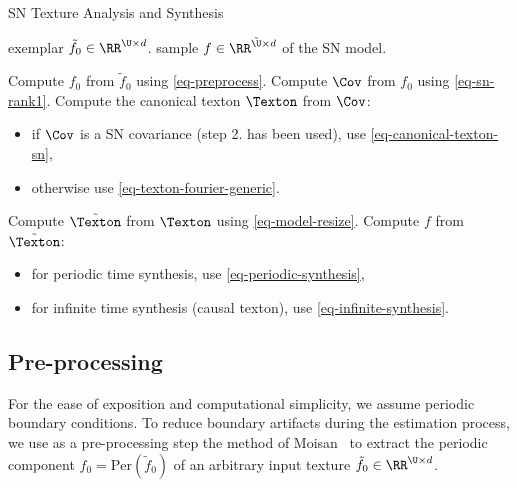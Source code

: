 \begin{algorithm}[ht!]
\caption{SN Texture Analysis and Synthesis}
\label{alg-gaussian-texture-modeling}
\begin{algorithmic}[1]
\Require exemplar $\tilde f_0 \in \RR^{\U \times d}$.
\Ensure sample $f \in \RR^{\tilde \U \times d}$ of the SN model.
\Statex
\begin{enumerate}
	 Compute $f_0$ from $\tilde f_0$ using \eqref{eq-preprocess}.
	 Compute $\Cov$ from $f_0$ using \eqref{eq-sn-rank1}.
	 Compute the canonical texton $\Texton$ from $\Cov$:
		\begin{itemize}
			\item if $\Cov$ is a SN covariance (step 2. has been used), 
				use \eqref{eq-canonical-texton-sn},
			\item otherwise use \eqref{eq-texton-fourier-generic}.
		\end{itemize}
	 Compute $\tilde \Texton$ from $\Texton$ using \eqref{eq-model-resize}.
	 Compute $f$ from $\tilde\Texton$:
		\begin{itemize}
			\item for periodic time synthesis, use \eqref{eq-periodic-synthesis},
			\item for infinite time synthesis (causal texton), use \eqref{eq-infinite-synthesis}.  
		\end{itemize}
\end{enumerate}
\end{algorithmic}
\end{algorithm}



\subsection{Pre-processing} 
\label{subsec-preprocess-sn}

For the ease of exposition and computational simplicity, we assume periodic boundary conditions. To reduce boundary artifacts during the estimation process, we use as a pre-processing step the method of Moisan~\cite{Moisan11} to extract the periodic component $f_0 = \textrm{Per}(\tilde f_0)$ of an arbitrary input texture $\tilde f_0 \in \RR^{\U \times d}$. 

